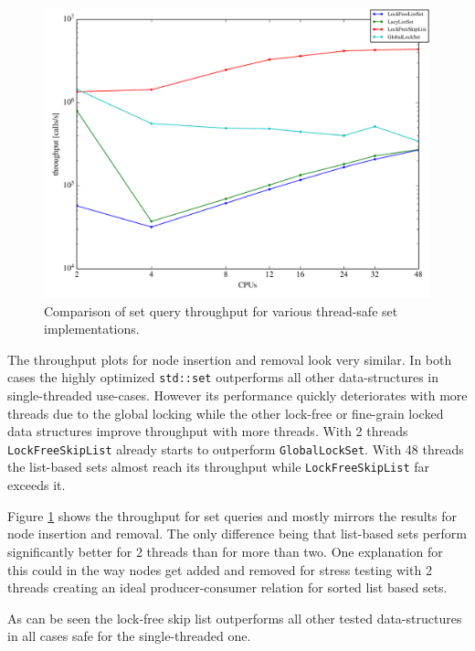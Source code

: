 \documentclass{article}
\begin{document}
\begin{figure}[htb]
  \centering
  \includegraphics[width=0.9\linewidth]{figures/contains}
  \caption{Comparison of set query throughput for various thread-safe set implementations.}
  \label{contains}
\end{figure}


The throughput plots for node insertion and removal look very similar.
In both cases the highly optimized \texttt{std::set} outperforms all other data-structures in single-threaded use-cases.
However its performance quickly deteriorates with more threads due to the global locking while the other lock-free or fine-grain locked data structures improve throughput with more threads.
With 2 threads \texttt{LockFreeSkipList} already starts to outperform \texttt{GlobalLockSet}.
With 48 threads the list-based sets almost reach its throughput while \texttt{LockFreeSkipList} far exceeds it.

Figure \ref{contains} shows the throughput for set queries and mostly mirrors the results for node insertion and removal.
The only difference being that list-based sets perform significantly better for 2 threads than for more than two.
One explanation for this could in the way nodes get added and removed for stress testing with 2 threads creating an ideal producer-consumer relation for sorted list based sets.

As can be seen the lock-free skip list outperforms all other tested data-structures in all cases safe for the single-threaded one.
\end{document}
